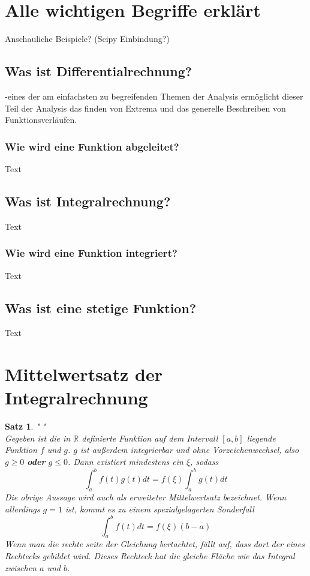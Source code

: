 \documentclass[fontsize=12pt,paper=a4,DIV12,cleardoublepage=empty, 
liststotoc,idxtotoc,bibtotoc]{article}
\newcommand{\RR}{\mathbb{R}}
\theoremstyle{plain}
\newtheorem{satz}{Satz}[subsection]
\theoremstyle{definition}
\begin{document}
	\section{Alle wichtigen Begriffe erklärt}
	Anschauliche Beispiele? (Scipy Einbindung?)
	
	
	\subsection{Was ist Differentialrechnung?}
	-eines der am einfachsten zu begreifenden Themen der Analysis ermöglicht dieser Teil der Analysis das finden von Extrema und das generelle Beschreiben von Funktionsverläufen.
	
	
	\subsubsection{Wie wird eine Funktion abgeleitet?}
		Text
	
	
	\subsection{Was ist Integralrechnung?}
		Text


	\subsubsection{Wie wird eine Funktion integriert?}
		Text
		
	
	\subsection{Was ist eine stetige Funktion?}
		Text	
	
	
	\section{Mittelwertsatz der Integralrechnung}
	\begin{satz}" "\\
		Gegeben ist die in $\RR$ definierte Funktion auf dem Intervall $[a, b]$ liegende Funktion $f$ und $g$. $g$ ist außerdem integrierbar und ohne Vorzeichenwechsel, also $g \geq 0$ \textbf{oder} $g \leq 0$. Dann existiert mindestens ein $\xi$, sodass
		\begin{equation*}
			\int_{a}^{b}f(t)g(t)dt=f(\xi)\int_{a}^{b}g(t)dt			
		\end{equation*}
		Die obrige Aussage wird auch als erweiteter Mittelwertsatz bezeichnet. Wenn allerdings $g=1$ ist, kommt es zu einem spezialgelagerten Sonderfall\\
		\begin{equation*}
			\int_{a}^{b}f(t)dt=f(\xi)(b-a)
		\end{equation*}
		Wenn man die rechte seite der Gleichung bertachtet, fällt auf, dass dort der eines Rechtecks gebildet wird. Dieses Rechteck hat die gleiche Fläche wie das Integral zwischen $a$ und $b$.		
		
	\end{satz}
	
\end{document}
